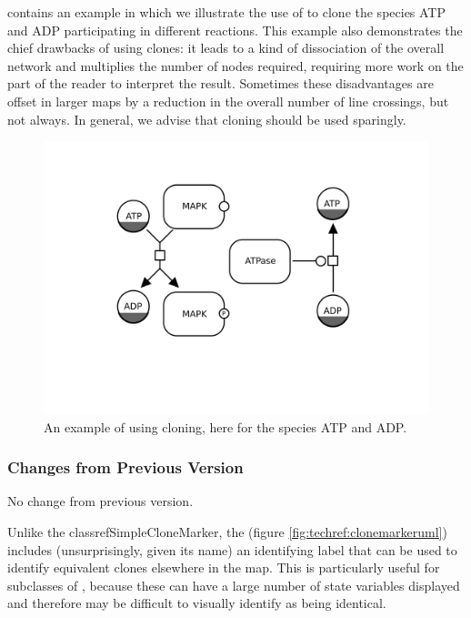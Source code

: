  contains an example in which we illustrate the use of  to clone the species ATP and ADP participating in different reactions.  This example also demonstrates the chief drawbacks of using clones: it leads to a kind of dissociation of the overall network and multiplies the number of nodes required, requiring more work on the part of the reader to interpret the result.  Sometimes these disadvantages are offset in larger maps by a reduction in the overall number of line crossings, but not always.  In general, we advise that cloning should be used sparingly.

\begin{figure}[htb]
  \centering
  \includegraphics[scale = 0.5]{examples/cloning}
  \caption{An example of using cloning, here for the species ATP and ADP.}
  \label{fig:techref:example-cloning}
\end{figure}

\subsubsection{Changes from Previous Version}

No change from previous version.


\label{defn:LabelledCloneMarker}

Unlike the classref{SimpleCloneMarker}, the
 (figure \ref{fig:techref:clonemarkeruml})
includes (unsurprisingly, given its name) an identifying label that
can be used to identify equivalent clones elsewhere in the map.  This
is particularly useful for subclasses of ,
because these can have a large number of state variables displayed and
therefore may be difficult to visually identify as being identical.

